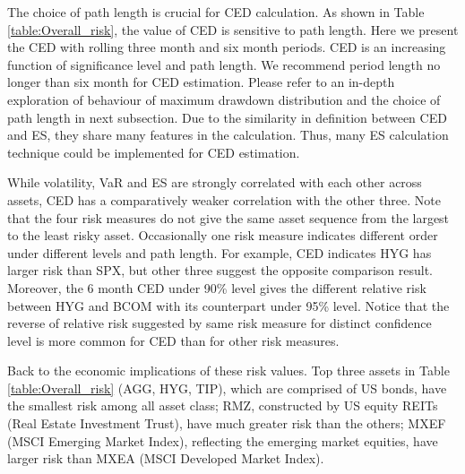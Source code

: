 \documentclass[11pt]{article}
\begin{document}
The choice of path length is crucial for CED calculation. As shown in Table \ref{table:Overall_risk}, the value of CED is sensitive to path length. Here we present the CED with rolling three month and six month periods. CED is an increasing function of significance level and path length. We recommend period length no longer than six month for CED estimation. Please refer to an in-depth exploration of behaviour of maximum drawdown distribution and the choice of path length in next subsection. Due to the similarity in definition between CED and ES, they share many features in the calculation. Thus, many ES calculation technique could be implemented for CED estimation. 

While volatility, VaR and ES are strongly correlated with each other across assets, CED has a comparatively weaker correlation with the other three. Note that the four risk measures do not give the same asset sequence from the largest to the least risky asset. Occasionally one risk measure indicates different order under different levels and path length. For example, CED indicates HYG has larger risk than SPX, but other three suggest the opposite comparison result. Moreover, the 6 month CED under 90\% level gives the different relative risk between HYG and BCOM with its counterpart under 95\% level. Notice that the reverse of relative risk suggested by same risk measure for distinct confidence level is more common for CED than for other risk measures.

Back to the economic implications of these risk values. Top three assets in Table \ref{table:Overall_risk} (AGG, HYG, TIP), which are comprised of US bonds, have the smallest risk among all asset class; RMZ, constructed by US equity REITs (Real Estate Investment Trust), have much greater risk than the others; MXEF (MSCI Emerging Market Index), reflecting the emerging market equities, have larger risk than MXEA (MSCI Developed Market Index).
\end{document}
